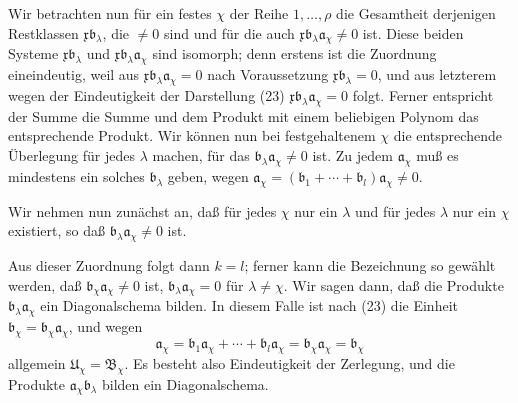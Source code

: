 \documentclass[11pt]{article}
\newcommand{\mB}{\mathfrak{B}}
\newcommand{\ma}{\mathfrak{a}}
\newcommand{\mb}{\mathfrak{b}}
\newcommand{\mx}{\mathfrak{x}}
\providecommand{\mU}{\mathfrak{U}}
\begin{document}
Wir betrachten nun für ein festes $\chi$ der Reihe $1,
\ldots,\rho$ die Gesamtheit derjenigen Restklassen $\mx\mb_\lambda$, die $\ne0$ sind und für die auch $\mx\mb_\lambda\ma_\chi\ne0$ ist. Diese beiden Systeme $\mx\mb_\lambda$ und $\mx\mb_\lambda\ma_\chi$ sind isomorph; denn erstens ist die Zuordnung eineindeutig, weil aus $\mx\mb_\lambda\ma_\chi=0$ nach Voraussetzung $\mx\mb_\lambda=0$, und aus letzterem wegen der Eindeutigkeit der Darstellung (23) $\mx\mb_\lambda\ma_\chi=0$ folgt. Ferner entspricht der Summe die Summe und dem Produkt mit einem beliebigen Polynom das entsprechende Produkt. Wir können nun bei festgehaltenem $\chi$ die entsprechende Überlegung für jedes $\lambda$ machen, für das $\mb_\lambda\ma_\chi\ne0$ ist. Zu jedem $\ma_\chi$ muß es mindestens ein solches $\mb_\lambda$ geben, wegen $\ma_\chi=(\mb_1+
\cdots+\mb_l)\ma_\chi\ne0$.

Wir nehmen nun zunächst an, daß für jedes $\chi$ nur ein $\lambda$ und für jedes $\lambda$ nur ein $\chi$ existiert, so daß $\mb_\lambda\ma_\chi\ne0$ ist.

Aus dieser Zuordnung folgt dann $k=l$; ferner kann die Bezeichnung so gewählt werden, daß $\mb_\chi\ma_\chi\ne0$ ist, $\mb_\lambda\ma_\chi=0$ für $\lambda\ne\chi$. Wir sagen dann, daß die Produkte $\mb_\lambda\ma_\chi$ ein Diagonalschema bilden. In diesem Falle ist nach (23) die Einheit $\mb_\chi=\mb_\chi\ma_\chi$, und wegen
\begin{equation}
 \ma_\chi=\mb_1\ma_\chi+\cdots+\mb_l\ma_\chi=\mb_\chi\ma_\chi=\mb_\chi
\tag{24}
\end{equation}
allgemein $\mU_\chi=\mB_\chi$. Es besteht also Eindeutigkeit der Zerlegung, und die Produkte $\ma_\chi\mb_\lambda$ bilden ein Diagonalschema.
\end{document}

